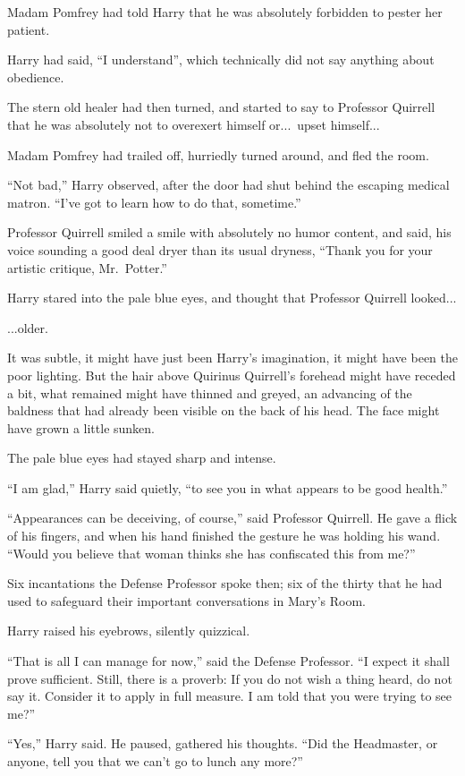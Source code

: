 Madam Pomfrey had told Harry that he was absolutely forbidden to pester her patient.

Harry had said, “I understand”, which technically did not say anything about obedience.

The stern old healer had then turned, and started to say to Professor Quirrell that he was absolutely not to overexert himself or...\ upset himself...

Madam Pomfrey had trailed off, hurriedly turned around, and fled the room.

“Not bad,” Harry observed, after the door had shut behind the escaping medical matron. “I’ve got to learn how to do that, sometime.”

Professor Quirrell smiled a smile with absolutely no humor content, and said, his voice sounding a good deal dryer than its usual dryness, “Thank you for your artistic critique, Mr.~Potter.”

Harry stared into the pale blue eyes, and thought that Professor Quirrell looked...

...older.

It was subtle, it might have just been Harry’s imagination, it might have been the poor lighting. But the hair above Quirinus Quirrell’s forehead might have receded a bit, what remained might have thinned and greyed, an advancing of the baldness that had already been visible on the back of his head. The face might have grown a little sunken.

The pale blue eyes had stayed sharp and intense.

“I am glad,” Harry said quietly, “to see you in what appears to be good health.”

“Appearances can be deceiving, of course,” said Professor Quirrell. He gave a flick of his fingers, and when his hand finished the gesture he was holding his wand. “Would you believe that woman thinks she has confiscated this from me?”

Six incantations the Defense Professor spoke then; six of the thirty that he had used to safeguard their important conversations in Mary’s Room.

Harry raised his eyebrows, silently quizzical.

“That is all I can manage for now,” said the Defense Professor. “I expect it shall prove sufficient. Still, there is a proverb: If you do not wish a thing heard, do not say it. Consider it to apply in full measure. I am told that you were trying to see me?”

“Yes,” Harry said. He paused, gathered his thoughts. “Did the Headmaster, or anyone, tell you that we can’t go to lunch any more?”

